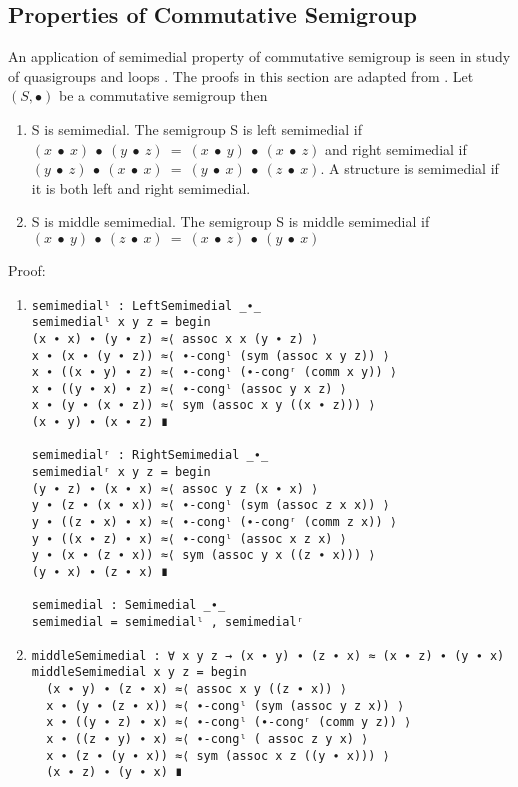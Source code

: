 \subsection{Properties of Commutative Semigroup}
An application of semimedial property of commutative semigroup is seen in study
of quasigroups and loops \cite{liaqat2021some}. The proofs in this section are
adapted from \cite{deng2016characterizations}. Let $(S, ∙)$ be a commutative
semigroup then
\begin{enumerate}
\item S is semimedial. The semigroup S is left semimedial if  \(
(x\ ∙\ x)\ ∙\ (y\ ∙\ z)\ =\ (x\ ∙\ y)\ ∙\ (x\ ∙\ z) \) and right
semimedial if \( (y\ ∙\ z)\ ∙\ (x\ ∙\ x)\ =\ (y\ ∙\ x)\ ∙\ (z\ ∙\ x) \).
A structure is semimedial if it is both left and right semimedial. 
\item S is middle semimedial. The semigroup S is middle semimedial if
\((x\ ∙\ y)\ ∙\ (z\ ∙\ x)\ =\ (x\ ∙\ z)\ ∙\ (y\ ∙\
x)\)
\end{enumerate}
Proof:
\begin{enumerate}
\item
\begin{verbatim}
semimedialˡ : LeftSemimedial _∙_
semimedialˡ x y z = begin
(x ∙ x) ∙ (y ∙ z) ≈⟨ assoc x x (y ∙ z) ⟩
x ∙ (x ∙ (y ∙ z)) ≈⟨ ∙-congˡ (sym (assoc x y z)) ⟩
x ∙ ((x ∙ y) ∙ z) ≈⟨ ∙-congˡ (∙-congʳ (comm x y)) ⟩
x ∙ ((y ∙ x) ∙ z) ≈⟨ ∙-congˡ (assoc y x z) ⟩
x ∙ (y ∙ (x ∙ z)) ≈⟨ sym (assoc x y ((x ∙ z))) ⟩
(x ∙ y) ∙ (x ∙ z) ∎

semimedialʳ : RightSemimedial _∙_
semimedialʳ x y z = begin
(y ∙ z) ∙ (x ∙ x) ≈⟨ assoc y z (x ∙ x) ⟩
y ∙ (z ∙ (x ∙ x)) ≈⟨ ∙-congˡ (sym (assoc z x x)) ⟩
y ∙ ((z ∙ x) ∙ x) ≈⟨ ∙-congˡ (∙-congʳ (comm z x)) ⟩
y ∙ ((x ∙ z) ∙ x) ≈⟨ ∙-congˡ (assoc x z x) ⟩
y ∙ (x ∙ (z ∙ x)) ≈⟨ sym (assoc y x ((z ∙ x))) ⟩
(y ∙ x) ∙ (z ∙ x) ∎

semimedial : Semimedial _∙_
semimedial = semimedialˡ , semimedialʳ
\end{verbatim}
\item
\begin{verbatim}
middleSemimedial : ∀ x y z → (x ∙ y) ∙ (z ∙ x) ≈ (x ∙ z) ∙ (y ∙ x)
middleSemimedial x y z = begin
  (x ∙ y) ∙ (z ∙ x) ≈⟨ assoc x y ((z ∙ x)) ⟩
  x ∙ (y ∙ (z ∙ x)) ≈⟨ ∙-congˡ (sym (assoc y z x)) ⟩
  x ∙ ((y ∙ z) ∙ x) ≈⟨ ∙-congˡ (∙-congʳ (comm y z)) ⟩
  x ∙ ((z ∙ y) ∙ x) ≈⟨ ∙-congˡ ( assoc z y x) ⟩
  x ∙ (z ∙ (y ∙ x)) ≈⟨ sym (assoc x z ((y ∙ x))) ⟩
  (x ∙ z) ∙ (y ∙ x) ∎
\end{verbatim}
\end{enumerate}
